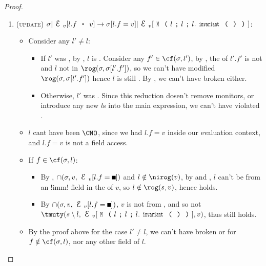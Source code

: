 \begin{proof}
\begin{enumerate}
\item (\textsc{update}) $\sigma|\EV[l.f\equals{}v]\rightarrow \sigma[l.f=v]|\EV[\M{l}{l}{l.\invariant}]$:
\begin{itemize}
\item Consider any $l' \neq l$:
\begin{itemize}
		\item If $l'$ was \CNE, by , $l$ is \muty. Consider any $f' \in \cf(\s, l')$, by \CNE, the \rog of $l'.f'$ is not \tmuty and $l$ not in $\rog(\s, \s[l'.f'])$, so we can't have modified $\rog(\s, \s[l'.f'])$ hence $l$ is still \CNC. By , we can't have broken \CNE either.
		\item Otherwise, $l'$ was \CNO. Since this reduction dosen't remove monitors, or introduce any new $l$s into the main expression, we can't have violated \CNO.
\end{itemize}
\item $l$ cant have been $\CNO$, since we had $l.f = v$ inside our evaluation context, and $l.f = v$ is not a field access.
\item If $f \in \cf(\s, l)$:
\begin{itemize} 
\item By , $\cap(\s, v, \EV[l.f = \square])$ and $l \notin \nirog(v)$, by  and , $l$ can't be \reach from an \Q!imm! field in the \rog of $v$, so $l\notin \rog(s, v)$, hence \CNC holds.
\item By $\cap(\s, v, \EV[l.f = \square])$, $v$ is not \tmuty from \EV, and so not $\tmuty(s\setminus l, \EV[\M{l}{l}{l.\invariant}], v)$, thus \CNE still holds.
\end{itemize}
\item By the proof above for the case $l' \neq l$, we can't have broken \CNE or \CNC for $f \notin \cf(\s, l)$, nor any other field of $l$.
\end{itemize}



\end{enumerate}
\end{proof}
